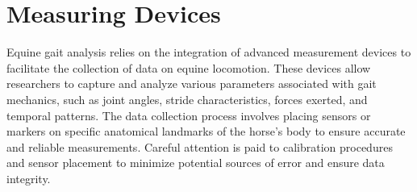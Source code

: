 \section{Measuring Devices} \label{datacollection-devices}

Equine gait analysis relies on the integration of advanced measurement devices to facilitate the collection of data on equine locomotion. These devices allow researchers to capture and analyze various parameters associated with gait mechanics, such as joint angles, stride characteristics, forces exerted, and temporal patterns. The data collection process involves placing sensors or markers on specific anatomical landmarks of the horse's body to ensure accurate and reliable measurements. Careful attention is paid to calibration procedures and sensor placement to minimize potential sources of error and ensure data integrity. 

